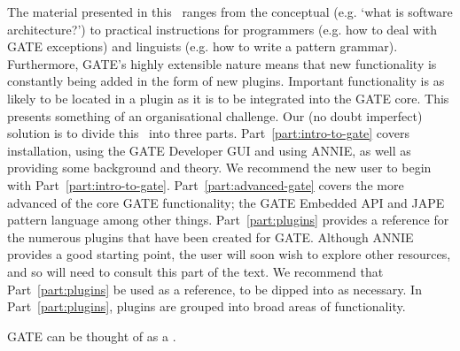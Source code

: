 The material presented in this \thing\ ranges from the conceptual (e.g. `what is
software architecture?') to practical instructions for programmers (e.g. how to
deal with GATE exceptions) and linguists (e.g. how to write a pattern grammar).
Furthermore, GATE's highly extensible nature means that new functionality is
constantly being added in the form of new plugins. Important functionality is as
likely to be located in a plugin as it is to be integrated into the GATE core.
This presents something of an organisational challenge. Our (no doubt imperfect)
solution is to divide this \thing\ into three parts.
Part~\ref{part:intro-to-gate} covers installation, using the GATE Developer GUI
and using ANNIE, as well as providing some background and theory. We recommend
the new user to begin with Part~\ref{part:intro-to-gate}.
Part~\ref{part:advanced-gate} covers the more advanced of the core GATE
functionality; the GATE Embedded API and JAPE pattern language among other
things. Part~\ref{part:plugins} provides a reference for the numerous plugins
that have been created for GATE. Although ANNIE provides a good starting point,
the user will soon wish to explore other resources, and so will need to consult
this part of the text. We recommend that Part~\ref{part:plugins} be used as a
reference, to be dipped into as necessary. In Part~\ref{part:plugins}, plugins
are grouped into broad areas of functionality.





GATE can be thought of as a
 \cite{Cun00a}.

